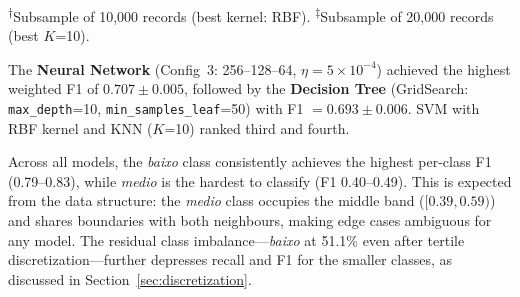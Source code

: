 \documentclass[conference]{IEEEtran}
\begin{document}
\begin{table}[htbp]
\centering
\caption{Classification Results -- 10-Fold Stratified Cross-Validation (weighted metrics)}
\small
{}
\vspace{1mm}
\footnotesize{\textsuperscript{$\dagger$}Subsample of 10,000 records (best kernel: RBF). \textsuperscript{$\ddagger$}Subsample of 20,000 records (best $K$=10).}
\label{tab:classification_results}
\end{table}

The \textbf{Neural Network} (Config~3: 256--128--64, $\eta=5{\times}10^{-4}$) achieved the highest weighted F1 of $0.707 \pm 0.005$, followed by the \textbf{Decision Tree} (GridSearch: \texttt{max\_depth}=10, \texttt{min\_samples\_leaf}=50) with F1 $= 0.693 \pm 0.006$. SVM with RBF kernel and KNN ($K$=10) ranked third and fourth.

Across all models, the \textit{baixo} class consistently achieves the highest per-class F1 (0.79--0.83), while \textit{medio} is the hardest to classify (F1 0.40--0.49). This is expected from the data structure: the \textit{medio} class occupies the middle band ($[0.39, 0.59)$) and shares boundaries with both neighbours, making edge cases ambiguous for any model. The residual class imbalance---\textit{baixo} at 51.1\% even after tertile discretization---further depresses recall and F1 for the smaller classes, as discussed in Section~\ref{sec:discretization}.
\end{document}
